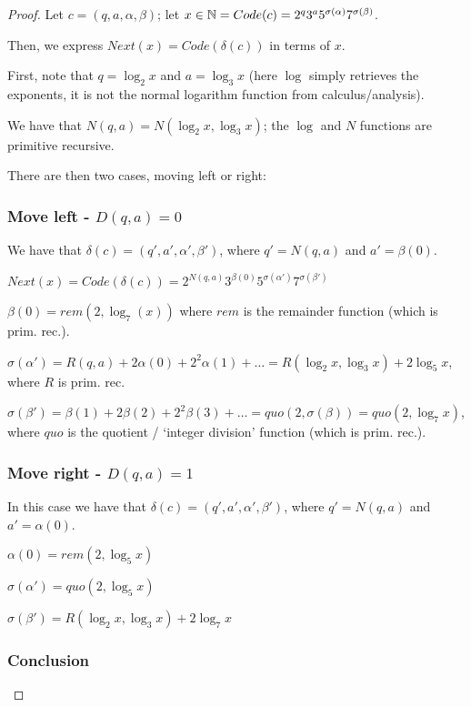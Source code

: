 \begin{proof}

Let $ c = (q, a, \alpha, \beta) $; let $ x \in \mathbb{N} = Code(c) = 2^q 3^a 5^{\sigma(\alpha)} 7^{\sigma(\beta)} $.

Then, we express $ Next(x) = Code(\delta(c)) $ in terms of $ x $.

First, note that $ q = \log_2 x $ and $ a = \log_3 x $ (here $ \log $ simply retrieves the exponents, it is not the normal logarithm function from calculus/analysis).

We have that $ N(q, a) = N(\log_2 x, \log_3 x) $; the $ \log $ and $ N $ functions are primitive recursive.

There are then two cases, moving left or right:

\newpage

\subsubsection{Move left - $ D(q, a) = 0 $}

We have that $ \delta(c) = (q', a', \alpha', \beta') $, where $ q' = N(q, a) $ and $ a' = \beta(0) $.

$ Next(x) = Code(\delta(c)) = 2^{N(q, a)} 3^{\beta(0)} 5^{\sigma(\alpha')} 7^{\sigma(\beta')} $

$ \beta(0) = rem(2, \log_7 (x)) $ where $ rem $ is the remainder function (which is prim. rec.).

$ \sigma(\alpha') = R(q, a) + 2 \alpha(0) + 2^2 \alpha(1) + \dots = R(\log_2 x, \log_3 x) + 2 \log_5 x$, where $ R $ is prim. rec.

$ \sigma(\beta') = \beta(1) + 2 \beta(2) + 2^2 \beta(3) + \dots = quo(2, \sigma(\beta)) = quo(2, \log_7 x) $, where $ quo $ is the quotient / `integer division' function (which is prim. rec.).

\subsubsection{Move right - $ D(q, a) = 1 $}

In this case we have that $ \delta(c) = (q', a', \alpha', \beta') $, where $ q' = N(q, a) $ and $ a' = \alpha(0) $.

$ \alpha(0) = rem(2, \log_5 x) $

$ \sigma(\alpha') = quo(2, \log_5 x) $

$ \sigma(\beta') = R(\log_2 x, \log_3 x) + 2 \log_7 x $

\subsubsection{Conclusion}


\end{proof}
